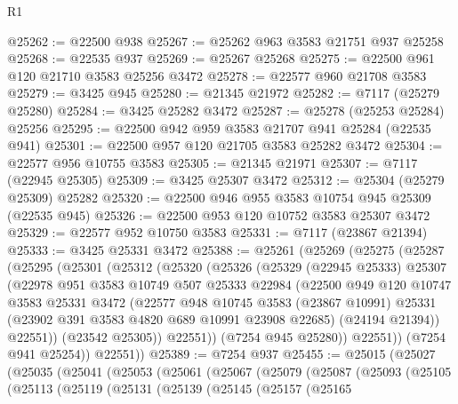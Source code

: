 \begin{lexlean}{R1}
\begin{coremodule}
@25262 := @22500 @938
@25267 := @25262 @963 @3583 @21751 @937 @25258
@25268 := @22535 @937
@25269 := @25267 @25268
@25275 := @22500 @961 @120 @21710 @3583 @25256 @3472
@25278 := @22577 @960 @21708 @3583
@25279 := @3425 @945
@25280 := @21345 @21972
@25282 := @7117 (@25279 @25280)
@25284 := @3425 @25282 @3472
@25287 := @25278 (@25253 @25284) @25256
@25295 := @22500 @942 @959 @3583 @21707 @941 @25284 (@22535 @941)
@25301 := @22500 @957 @120 @21705 @3583 @25282 @3472
@25304 := @22577 @956 @10755 @3583
@25305 := @21345 @21971
@25307 := @7117 (@22945 @25305)
@25309 := @3425 @25307 @3472
@25312 := @25304 (@25279 @25309) @25282
@25320 := @22500 @946 @955 @3583 @10754 @945 @25309 (@22535 @945)
@25326 := @22500 @953 @120 @10752 @3583 @25307 @3472
@25329 := @22577 @952 @10750 @3583
@25331 := @7117 (@23867 @21394)
@25333 := @3425 @25331 @3472
@25388 := @25261
    (@25269
      (@25275
        (@25287
          (@25295
            (@25301
              (@25312
                (@25320
                  (@25326
                    (@25329
                      (@22945 @25333)
                      @25307
                      (@22978
                        @951
                        @3583
                        @10749
                        @507
                        @25333
                        @22984
                        (@22500
                          @949
                          @120
                          @10747
                          @3583
                          @25331
                          @3472
                          (@22577
                            @948
                            @10745
                            @3583
                            (@23867 @10991)
                            @25331
                            (@23902 @391 @3583 @4820 @689 @10991 @23908 @22685)
                            (@24194 @21394))
                          @22551))
                      (@23542 @25305))
                    @22551))
                (@7254 @945 @25280))
              @22551))
          (@7254 @941 @25254))
        @22551))
@25389 := @7254 @937
@25455 := @25015
    (@25027
      (@25035
        (@25041
          (@25053
            (@25061
              (@25067
                (@25079
                  (@25087
                    (@25093
                      (@25105
                        (@25113
                          (@25119
                            (@25131
                              (@25139
                                (@25145
                                  (@25157
                                    (@25165

\end{coremodule}
\end{lexlean}
